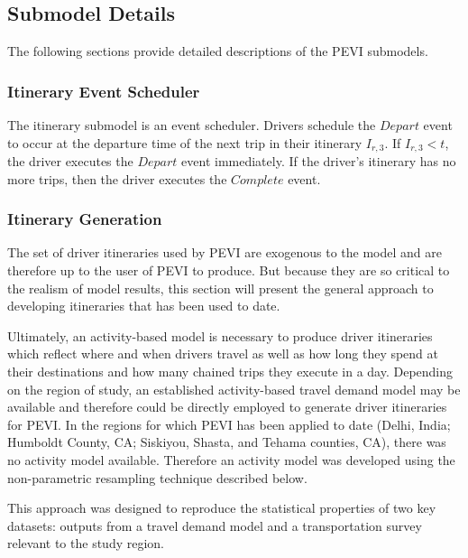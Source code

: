 \documentclass[journal]{IEEEtran}
\begin{document}
\subsection{Submodel Details} \label{submodels}
The following sections provide detailed descriptions of the PEVI submodels.

\subsubsection{Itinerary Event Scheduler} \label{itinSched}
The itinerary submodel is an event scheduler.  Drivers schedule the $Depart$ event to occur at the departure time of the next trip in their itinerary $I_{r,3}$.  If $I_{r,3} < t$, the driver executes the $Depart$ event immediately. If the driver's itinerary has no more trips, then the driver executes the $Complete$ event.

\subsubsection{Itinerary Generation}\label{itinGen}
The set of driver itineraries used by PEVI are exogenous to the model and are therefore up to the user of PEVI to produce.  But because they are so critical to the realism of model results, this section will present the general approach to developing itineraries that has been used to date.  

Ultimately, an activity-based model is necessary to produce driver itineraries which reflect where and when drivers travel as well as how long they spend at their destinations and how many chained trips they execute in a day.  Depending on the region of study, an established activity-based travel demand model may be available and therefore could be directly employed to generate driver itineraries for PEVI.  In the regions for which PEVI has been applied to date (Delhi, India; Humboldt County, CA; Siskiyou, Shasta, and Tehama counties, CA), there was no activity model available.  Therefore an activity model was developed using the non-parametric resampling technique described below.

This approach was designed to reproduce the statistical properties of two key datasets: outputs from a travel demand model and a transportation survey relevant to the study region.  
\end{document}
